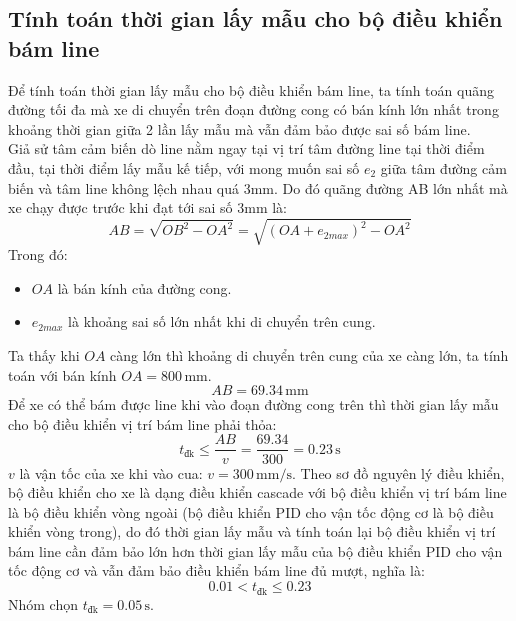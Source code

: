                
          \subsection{Tính toán thời gian lấy mẫu cho bộ điều khiển bám line}
               \hspace*{0.6cm}Để tính toán thời gian lấy mẫu cho bộ điều khiển bám line, ta tính toán quãng đường tối đa mà xe di chuyển trên đoạn đường cong 
               có bán kính lớn nhất trong khoảng thời gian giữa 2 lần lấy mẫu mà vẫn đảm bảo được sai số bám line.\\
               \hspace*{0.6cm}Giả sử tâm cảm biến dò line nằm ngay tại vị trí tâm đường line tại thời điểm đầu, tại thời điểm lấy mẫu kế tiếp, với mong muốn sai số $e_2$ giữa tâm đường cảm biến 
               và tâm line không lệch nhau quá 3mm. Do đó quãng đường AB lớn nhất mà xe chạy được trước khi đạt tới sai số 3mm là: 
               \begin{equation*}
                    AB = \sqrt{OB^2 - OA^2} = \sqrt{(OA + e_{2max})^2 - OA^2}
               \end{equation*}
               \hspace*{0.6cm}Trong đó: 
               \begin{itemize}
                    \item $OA$ là bán kính của đường cong.
                    \item $e_{2max}$ là khoảng sai số lớn nhất khi di chuyển trên cung.
               \end{itemize}
               \hspace*{0.6cm}Ta thấy khi $OA$ càng lớn thì khoảng di chuyển trên cung của xe càng lớn, ta tính toán với bán kính $OA = 800 \,\mathrm{mm}$.
               \begin{equation*}
                    AB = 69.34 \,\mathrm{mm}
               \end{equation*}
               \hspace*{0.6cm}Để xe có thể bám được line khi vào đoạn đường cong trên thì thời gian lấy mẫu cho bộ điều khiển vị trí bám line phải thỏa: 
               \begin{equation*}
                    t_{\text{đk}} \leq \dfrac{AB}{v} = \dfrac{69.34}{300} = 0.23 \,\mathrm{s}
               \end{equation*}
               \hspace*{0.6cm}$v$ là vận tốc của xe khi vào cua: $v = 300 \,\mathrm{mm/s}$. Theo sơ đồ nguyên lý điều khiển, bộ điều khiển cho xe là dạng điều khiển cascade với bộ điều khiển vị trí bám line là bộ điều khiển vòng ngoài (bộ điều khiển PID cho vận tốc động cơ là bộ điều khiển vòng trong), do đó thời gian 
               lấy mẫu và tính toán lại bộ điều khiển vị trí bám line cần đảm bảo lớn hơn thời gian lấy mẫu của bộ điều khiển PID cho vận tốc động cơ và vẫn đảm bảo điều khiển bám line đủ mượt, nghĩa là:
               \begin{equation*}
                    0.01 < t_{\text{đk}} \leq 0.23
               \end{equation*}
               \hspace*{0.6cm}Nhóm chọn $t_{\text{đk}} = 0.05 \,\mathrm{s}$.
               

